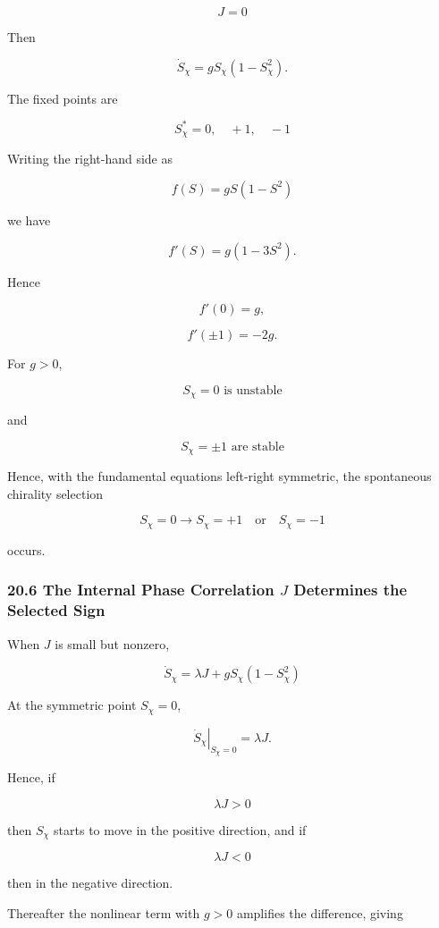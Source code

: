 \documentclass[
  a4paper,
]{article}
\begin{document}
\[
J=0
\]

Then

\[
\dot S_\chi
=
gS_\chi(1-S_\chi^2).
\tag{163}
\]

The fixed points are

\[
\boxed{
S_\chi^*=0,\quad +1,\quad -1
}
\tag{164}
\]

Writing the right-hand side as

\[
f(S)=gS(1-S^2)
\]

we have

\[
f'(S)
=
g(1-3S^2).
\]

Hence

\[
f'(0)=g,
\]

\[
f'(\pm1)=-2g.
\]

For \(g>0\),

\[
\boxed{
S_\chi=0
\text{ is unstable}
}
\tag{165}
\]

and

\[
\boxed{
S_\chi=\pm1
\text{ are stable}
}
\tag{166}
\]

Hence, with the fundamental equations left-right symmetric, the
spontaneous chirality selection

\[
\boxed{
S_\chi=0
\longrightarrow
S_\chi=+1
\quad\text{or}\quad
S_\chi=-1
}
\tag{167}
\]

occurs.

\subsubsection{\texorpdfstring{20.6 The Internal Phase Correlation \(J\)
Determines the Selected
Sign}{20.6 The Internal Phase Correlation J Determines the Selected Sign}}\label{the-internal-phase-correlation-j-determines-the-selected-sign}

When \(J\) is small but nonzero,

\[
\dot S_\chi
=
\lambda J
+
gS_\chi(1-S_\chi^2)
\]

At the symmetric point \(S_\chi=0\),

\[
\left.
\dot S_\chi
\right|_{S_\chi=0}
=
\lambda J.
\tag{168}
\]

Hence, if

\[
\lambda J>0
\]

then \(S_\chi\) starts to move in the positive direction, and if

\[
\lambda J<0
\]

then in the negative direction.

Thereafter the nonlinear term with \(g>0\) amplifies the difference,
giving
\end{document}
